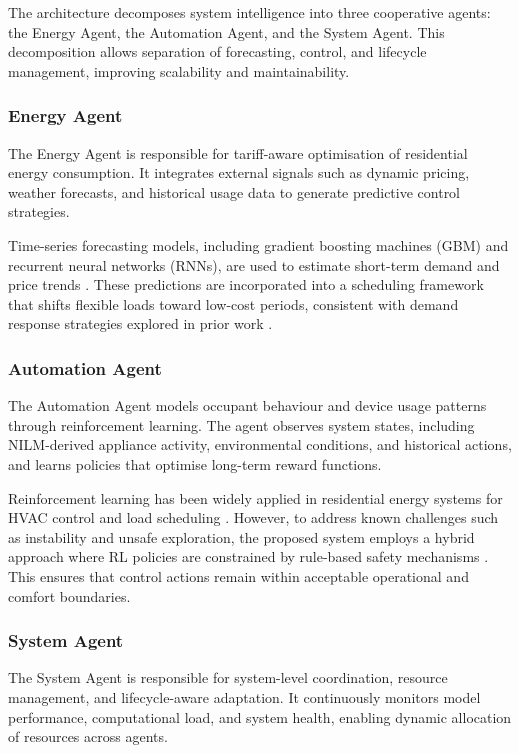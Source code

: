 \documentclass[11pt,a4paper]{article}
\begin{document}
The architecture decomposes system intelligence into three cooperative agents: the Energy Agent, the Automation Agent, and the System Agent. This decomposition allows separation of forecasting, control, and lifecycle management, improving scalability and maintainability.

\subsubsection{Energy Agent}

The Energy Agent is responsible for tariff-aware optimisation of residential energy consumption. It integrates external signals such as dynamic pricing, weather forecasts, and historical usage data to generate predictive control strategies.

Time-series forecasting models, including gradient boosting machines (GBM) and recurrent neural networks (RNNs), are used to estimate short-term demand and price trends \cite{hong2016probabilistic}. These predictions are incorporated into a scheduling framework that shifts flexible loads toward low-cost periods, consistent with demand response strategies explored in prior work \cite{paterakis2017overview}.

\subsubsection{Automation Agent}

The Automation Agent models occupant behaviour and device usage patterns through reinforcement learning. The agent observes system states, including NILM-derived appliance activity, environmental conditions, and historical actions, and learns policies that optimise long-term reward functions.

Reinforcement learning has been widely applied in residential energy systems for HVAC control and load scheduling \cite{wang2020reinforcement}. However, to address known challenges such as instability and unsafe exploration, the proposed system employs a hybrid approach where RL policies are constrained by rule-based safety mechanisms \cite{garcia2015comprehensive}. This ensures that control actions remain within acceptable operational and comfort boundaries.

\subsubsection{System Agent}

The System Agent is responsible for system-level coordination, resource management, and lifecycle-aware adaptation. It continuously monitors model performance, computational load, and system health, enabling dynamic allocation of resources across agents.
\end{document}

